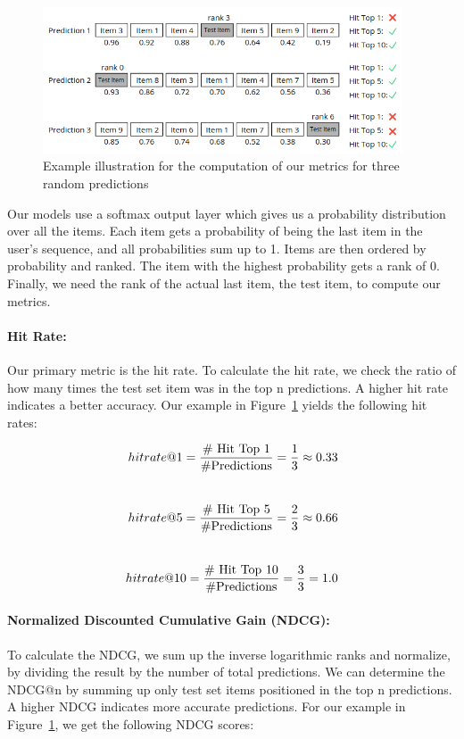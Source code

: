 \begin{figure}[htbp]
\centering
\includegraphics[width=0.95\textwidth]{images/illustrations/metrics.png}
\caption{Example illustration for the computation of our metrics for three random predictions}
\label{fig:illustration_metrics}
\end{figure}

Our models use a softmax output layer which gives us a probability distribution over all the items. Each item gets a probability of being the last item in the user's sequence, and all probabilities sum up to 1. Items are then ordered by probability and ranked. The item with the highest probability gets a rank of 0. Finally, we need the rank of the actual last item, the test item, to compute our metrics.


\paragraph{Hit Rate:}
Our primary metric is the hit rate. To calculate the hit rate, we check the ratio of how many times the test set item was in the top n predictions. A higher hit rate indicates a better accuracy. Our example in Figure~\ref{fig:illustration_metrics} yields the following hit rates:

\begin{equation}
\setlength{\jot}{25pt}
    \begin{aligned}
        hit rate @1=\frac{\text{\# Hit Top 1}}{\text{\#Predictions}}=\frac{1}{3}\approx0.33 \\
        hit rate @5=\frac{\text{\# Hit Top 5}}{\text{\#Predictions}}=\frac{2}{3} \approx 0.66\\
        hit rate @10=\frac{\text{\# Hit Top 10}}{\text{\#Predictions}}=\frac{3}{3}=1.0 
    \end{aligned}
    \label{equation:hit_rate}
\end{equation}

\paragraph{Normalized Discounted Cumulative Gain (NDCG):}
To calculate the NDCG, we sum up the inverse logarithmic ranks and normalize, by dividing the result by the number of total predictions. We can determine the NDCG@n by summing up only test set items positioned in the top n predictions. A higher NDCG indicates more accurate predictions. For our example in Figure~\ref{fig:illustration_metrics}, we get the following NDCG scores:

